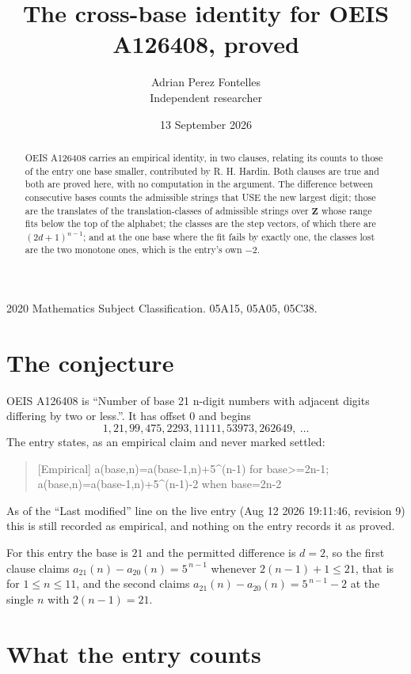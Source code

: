 \documentclass[11pt,a4paper]{article}
\title{The cross-base identity for OEIS A126408, proved}
\author{Adrian Perez Fontelles\\ \small Independent researcher}
\date{13 September 2026}
\theoremstyle{plain}
\theoremstyle{definition}
\begin{document}
\maketitle

\begin{abstract}
OEIS A126408 carries an empirical identity, in two clauses, relating its counts to those of the
entry one base smaller, contributed by R. H. Hardin. Both clauses are true and both are proved
here, with no computation in the argument. The difference between consecutive bases counts the
admissible strings that USE the new largest digit; those are the translates of the
translation-classes of admissible strings over $\mathbf{Z}$ whose range fits below the top of
the alphabet; the classes are the step vectors, of which there are $(2d+1)^{n-1}$; and at the
one base where the fit fails by exactly one, the classes lost are the two monotone ones, which
is the entry's own $-2$.
\end{abstract}

\noindent\small 2020 Mathematics Subject Classification. 05A15, 05A05, 05C38.\normalsize

\section{The conjecture}

OEIS A126408 is ``Number of base 21 n-digit numbers with adjacent digits differing by two or less.''. It has offset $0$ and begins
\[
1, 21, 99, 475, 2293, 11111, 53973, 262649,\ \dots
\]
The entry states, as an empirical claim and never marked settled:
\begin{quote}
[Empirical] a(base,n)=a(base-1,n)+5\textasciicircum{}(n-1) for base>=2n-1; a(base,n)=a(base-1,n)+5\textasciicircum{}(n-1)-2 when base=2n-2
\end{quote}
As of the ``Last modified'' line on the live entry (Aug 12 2026 19:11:46, revision 9)
this is still recorded as empirical, and nothing on the entry records it as proved.

For this entry the base is $21$ and the permitted difference is $d=2$, so the first clause
claims $a_{21}(n)-a_{20}(n)=5^{\,n-1}$ whenever $2(n-1)+1\le21$, that is for
$1\le n\le11$, and the second claims $a_{21}(n)-a_{20}(n)=5^{\,n-1}-2$ at the single
$n$ with $2(n-1)=21$.

\section{What the entry counts}
\end{document}
